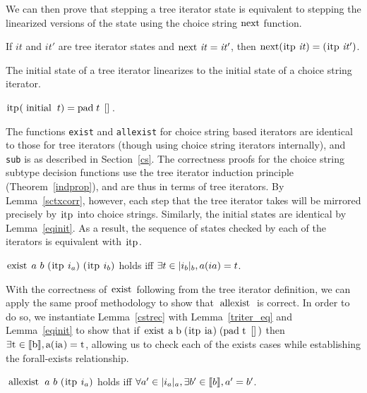 \documentclass[a4paper,english]{lipics-v2019}
\newcommand{\denotes}[1]{\llbracket #1 \rrbracket}
\renewcommand{\c}[1]{\ensuremath{\text{\lstinline{#1}}}\xspace}
\begin{document}
\noindent
We can then prove that stepping a tree iterator state is equivalent to
stepping the linearized versions of the state using the choice string
\c{next} function.

\begin{lemma}\label{sctxcorr}
If $\mathit{it}$ and $\mathit{it'}$ are tree iterator states and
$\c{next}~\mathit{it}=\mathit{it}'$, then $\c{next} (\c{itp}\;\mathit{it}) =
(\c{itp}\;\mathit{it'})$.
\end{lemma}
\noindent
The initial state of a tree iterator linearizes to the
initial state of a choice string iterator.

\begin{lemma}\label{eqinit}
$\c{itp} (\c{initial}\;t) = \c{pad}\;t\;\c{[]}$.
\end{lemma}

\noindent
The functions \verb|exist| and \verb|allexist| for choice string based
iterators are identical to those for tree iterators (though using choice
string iterators internally), and \verb|sub| is as described in
Section~\ref{cs}. The correctness proofs for the choice string subtype
decision functions use the tree iterator induction principle
(Theorem~\ref{indprop}), and are thus in terms of tree iterators. By
Lemma~\ref{sctxcorr}, however, each step that the tree iterator takes will be
mirrored precisely by \c{itp} into choice strings. Similarly, the initial states
are identical by Lemma~\ref{eqinit}. As a result, the sequence of states
checked by each of the iterators is equivalent with \c{itp}.

\begin{lemma}\label{cstrec}
$\c{exist}~a~b~(\c{itp}~i_a)~(\c{itp}~i_b)$ holds iff $\exists t \in
  |i_b|_{b}, a(ia)=t$.
\end{lemma}

\noindent With the correctness of \c{exist} following from the tree iterator
definition, we can apply the same proof methodology to show that \c{allexist}
is correct. In order to do so, we instantiate Lemma~\ref{cstrec}  with
Lemma~\ref{triter_eq} and Lemma~\ref{eqinit} to show that if $\c{exist}\;\c
a\;\c b\;(\c{itp}\;\c{ia})\;(\c{pad}\;\c t\;\c{[]})$ then $\exists \c t \in
\denotes{\c b}, \c a(\c{ia}) = \c t$, allowing us to check  each of the exists
cases while establishing the forall-exists relationship.

\begin{lemma}\label{cstraec}
$\c{allexist}~a~b~(\c{itp}~i_a)$
 holds iff $\forall a'\in\irch{i_a}{a}, \exists b'\in\denotes{b},a'=b'$.
\end{lemma}
\end{document}
